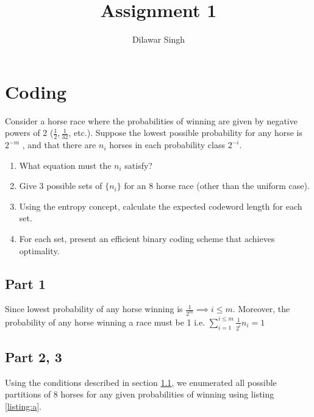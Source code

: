 \documentclass[a4paper,10pt]{article}
\title{Assignment 1}
\author{Dilawar Singh}
\begin{document}
\maketitle


\section{Coding}

Consider a horse race where the probabilities of winning are given by negative
powers of 2 ($\frac{1}{2}, \frac{1}{32}$, etc.). Suppose the lowest possible
probability for any horse is $2^{-m}$ , and that there are $n_i$ horses in each
probability class $2^{-i}$.

\begin{enumerate}
    \item What equation must the $n_i$ satisfy?  
    \item Give 3 possible sets of $\{n_i\}$ for an 8 horse race (other than the
        uniform case).
    \item Using the entropy concept, calculate the expected codeword length for
        each set.
    \item For each set, present an efficient binary coding scheme that achieves
        optimality.
\end{enumerate}


\subsection{Part 1}
\label{sec:parta}

Since lowest probability of any horse winning is $\frac{1}{2^m} \implies i \leq
m$. Moreover, the probability of any horse winning a race must be 1 i.e. $
\sum_{i=1}^{i \leq m} \frac{1}{2^i} n_i = 1 $

\subsection{Part 2, 3}

Using the conditions described in section \ref{sec:parta}, we enumerated all
possible partitions of 8 horses for any given probabilities of winning
using listing \ref{listing:a}.
\end{document}
